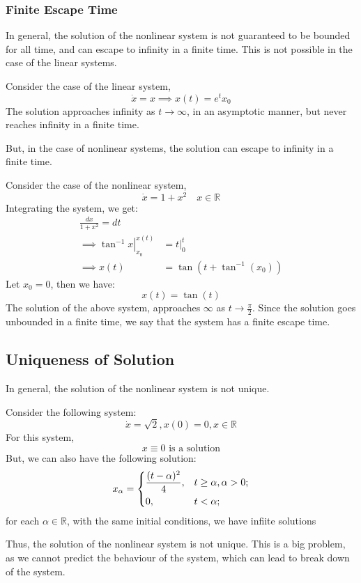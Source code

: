 \subsubsection{Finite Escape Time}
In general, the solution of the nonlinear system is not guaranteed to be bounded for all time, and 
can escape to infinity in a finite time. This is not possible in the case of the linear systems.
\begin{example}
    Consider the case of the linear system,
    \[
        \dot{x} = x \implies x(t) = e^{t} x_0
    \]
    The solution approaches infinity as \(t \to \infty\), in an asymptotic manner, but never reaches
    infinity in a finite time.
\end{example}
But, in the case of nonlinear systems, the solution can escape to infinity in a finite time.
\begin{example}
    Consider the case of the nonlinear system,
    \[
        \dot{x} = 1 + x^{2} \quad x \in \mathbb{R} 
    \]
    Integrating the system, we get:
    \[
        \begin{aligned}
            \frac{dx}{1+x^{2}} = dt \\
            \implies \left. \tan^{-1} x \right|_{x_0}^{x(t)} &= \left. t \right|_{0}^{t} \\
            \implies x(t) &= \tan(t + \tan^{-1}(x_0))
        \end{aligned}
    \]
    Let \(x_0 = 0\), then we have:
    \[
        x(t) = \tan(t)
    \]
    The solution of the above system, approaches \(\infty\) as \(t \to \frac{\pi}{2}\). Since the solution
    goes unbounded in a finite time, we say that the system has a finite escape time.  
\end{example}

\subsection{Uniqueness of Solution}
In general, the solution of the nonlinear system is not unique. 
\begin{example}
    Consider the following system:
    \[
        \dot{x} = \sqrt{2} ,x(0) = 0 , x \in \mathbb{R}  
    \]
    For this system,
    \[
        x \equiv 0 \text{ is a solution}
    \]
    But, we can also have the following solution:
    \[
        x_\alpha = \begin{dcases}
            \frac{(t - \alpha)^{2}}{4}, & t \geq \alpha, \alpha > 0 ;\\
            0 , & t< \alpha  ;\\
        \end{dcases}
    \]
    for each \(\alpha \in \mathbb{R}\), with the same initial conditions, we have infiite solutions 
\end{example}
Thus, the solution of the nonlinear system is not unique.
This is a big problem, as we cannot predict the behaviour of the system, which can lead to break
down of the system.